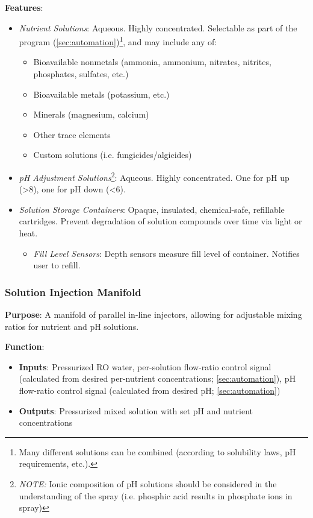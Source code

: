 \documentclass{../tex/report}
\begin{document}
\textbf{Features}:
\begin{itemize}
    \item \textit{Nutrient Solutions}: Aqueous. Highly concentrated. Selectable as part of the program (\ref{sec:automation})\footnote{Many different solutions can be combined (according to solubility laws, pH requirements, etc.).}, and may include any of:
    \begin{itemize}
        \item Bioavailable nonmetals (ammonia, ammonium, nitrates, nitrites, phosphates, sulfates, etc.)
        \item Bioavailable metals (potassium, etc.)
        \item Minerals (magnesium, calcium)
        \item Other trace elements
        \item Custom solutions (i.e. fungicides/algicides)
    \end{itemize} 
    \item \textit{pH Adjustment Solutions}\footnote{\textit{NOTE:} Ionic composition of pH solutions should be considered in the understanding of the spray (i.e. phosphic acid results in phosphate ions in spray)}: Aqueous. Highly concentrated. One for pH up (>8), one for pH down (<6).
    \item \textit{Solution Storage Containers}: Opaque, insulated, chemical-safe, refillable cartridges. Prevent degradation of solution compounds over time via light or heat.
    \begin{itemize}
        \item \textit{Fill Level Sensors}: Depth sensors measure fill level of container. Notifies user to refill.
    \end{itemize}
\end{itemize}

\vspace{.5cm}

\subsubsection{Solution Injection Manifold}
\label{sec:manifold}

\textbf{Purpose}: A manifold of parallel in-line injectors, allowing for adjustable mixing ratios for nutrient and pH solutions.

\textbf{Function}:
\begin{itemize}
    \item \textbf{Inputs}: Pressurized RO water, per-solution flow-ratio control signal (calculated from desired per-nutrient concentrations; \ref{sec:automation}), pH flow-ratio control signal (calculated from desired pH; \ref{sec:automation})
    \item \textbf{Outputs}: Pressurized mixed solution with set pH and nutrient concentrations
\end{itemize}
\end{document}
